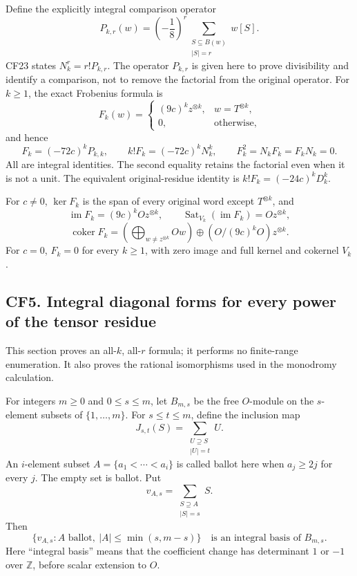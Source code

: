 \documentclass[
  10pt,
]{article}
\begin{document}
Define the explicitly integral comparison operator \[
 P_{k,r}(w)=\left(-\frac18\right)^r
 \sum_{\substack{S\subseteq B(w)\\|S|=r}}w[S].
 \tag{CF26}
\] CF23 states \(N_k^r=r!P_{k,r}\). The operator \(P_{k,r}\) is given
here to prove divisibility and identify a comparison, not to remove the
factorial from the original operator. For \(k\geq1\), the exact
Frobenius formula is \[
 \boxed{F_k(w)=
 \begin{cases}
 (9c)^kz^{\otimes k},&w=T^{\otimes k},\\
 0,&\text{otherwise},
 \end{cases}}
 \tag{CF27}
\] and hence \[
 F_k=(-72c)^kP_{k,k},\qquad
 k!F_k=(-72c)^kN_k^k,
 \qquad F_k^2=N_kF_k=F_kN_k=0.
 \tag{CF28}
\] All are integral identities. The second equality retains the
factorial even when it is not a unit. The equivalent original-residue
identity is \(k!F_k=(-24c)^kD_k^k\).

For \(c\neq0\), \(\ker F_k\) is the span of every original word except
\(T^{\otimes k}\), and \[
 \operatorname{im}F_k=(9c)^kOz^{\otimes k},
 \qquad\operatorname{Sat}_{V_k}(\operatorname{im}F_k)=Oz^{\otimes k},
\] \[
 \operatorname{coker}F_k
 =\left(\bigoplus_{w\neq z^{\otimes k}}Ow\right)
 \oplus (O/(9c)^kO)z^{\otimes k}.
 \tag{CF29}
\] For \(c=0\), \(F_k=0\) for every \(k\geq1\), with zero image and full
kernel and cokernel \(V_k\).

\subsection{CF5. Integral diagonal forms for every power of the tensor
residue}\label{cf5.-integral-diagonal-forms-for-every-power-of-the-tensor-residue}

This section proves an all-\(k\), all-\(r\) formula; it performs no
finite-range enumeration. It also proves the rational isomorphisms used
in the monodromy calculation.

For integers \(m\geq0\) and \(0\leq s\leq m\), let \(B_{m,s}\) be the
free \(O\)-module on the \(s\)-element subsets of \(\{1,\ldots,m\}\).
For \(s\leq t\leq m\), define the inclusion map \[
 J_{s,t}(S)=\sum_{\substack{U\supseteq S\\|U|=t}}U.
 \tag{CF30}
\] An \(i\)-element subset \(A=\{a_1<\cdots<a_i\}\) is called ballot
here when \(a_j\geq2j\) for every \(j\). The empty set is ballot. Put \[
 v_{A,s}=\sum_{\substack{S\supseteq A\\|S|=s}}S.
\] Then \[
 \{v_{A,s}: A\text{ ballot},\ |A|\leq\min(s,m-s)\}
 \quad\text{is an integral basis of }B_{m,s}.
 \tag{CF31}
\] Here ``integral basis'' means that the coefficient change has
determinant \(1\) or \(-1\) over \(\mathbb Z\), before scalar extension
to \(O\).
\end{document}
